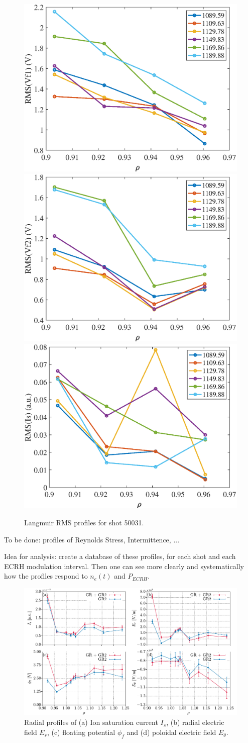 \documentclass[preprint,12pt,authoryear]{elsarticle}
\begin{document}
\begin{figure}[!ht]
\centering
   \includegraphics[width=0.32\columnwidth]{Images/50031_VF1_RMS.eps}
   \includegraphics[width=0.32\columnwidth]{Images/50031_VF2_RMS.eps}
   \includegraphics[width=0.32\columnwidth]{Images/50031_Is_RMS.eps}
   \caption{Langmuir RMS profiles for shot 50031.}
   \label{Fig:Langmuir_RMSprofiles1}
\end{figure}

To be done: profiles of Reynolds Stress, Intermittence, ...

Idea for analysis: create a database of these profiles, for each shot and each ECRH modulation interval. Then one can see more clearly and systematically how the profiles respond to $n_e(t)$ and $P_{ECRH}$. 

\begin{figure}[!ht]
    \centering
    \includegraphics[width=1.0\linewidth]{Images/Rake_D_low_density.pdf}
    \caption{Radial profiles of (a) Ion saturation current $I_{s}$, (b) radial electric field $E_{r}$, (c) floating potential $\phi_{f}$ and (d) poloidal electric field $E_{\theta}$.}
    \label{Fig:Rake_D_low_density}
\end{figure}
\end{document}
